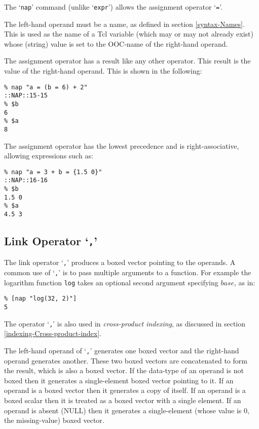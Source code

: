 The `\texttt{nap}' command (unlike `\texttt{expr}')
allows the assignment operator `\texttt{=}'.

The left-hand operand must be a name, as defined in section \ref{syntax-Names}.
This is used as the name of a Tcl variable (which may or may not already exist)
whose (string) value is set to the OOC-name of the right-hand operand.

The assignment operator has a result like any other operator.
This result is the value of the right-hand operand.
This is shown in the following:
  \begin{verbatim}
% nap "a = (b = 6) + 2"
::NAP::15-15
% $b
6
% $a
8
\end{verbatim}
  
The assignment operator has the lowest precedence and is
right-associative, allowing expressions such as:
  \begin{verbatim}
% nap "a = 3 + b = {1.5 0}"
::NAP::16-16
% $b
1.5 0
% $a
4.5 3
\end{verbatim}

\subsection{Link Operator `\texttt{,}'}
    \label{op-Link}
  
 The link operator `\texttt{,}' produces a boxed vector pointing to the
  operands. A common use of `\texttt{,}' is to pass multiple arguments to a function. For
  example the logarithm function 
  \texttt{log} takes an optional second argument specifying 
  $base$, as in:
  \begin{verbatim}
% [nap "log(32, 2)"]
5
\end{verbatim}

  
 The operator `\texttt{,}' is also used in 
  \textit{cross-product indexing}, as discussed in section 
  \ref{indexing-Cross-product-index}.
  
 The left-hand operand of `\texttt{,}' generates one boxed vector and the right-hand
  operand generates another. These two boxed vectors are concatenated
  to form the result, which is also a boxed vector. If the data-type of
  an operand is not boxed then it generates a single-element boxed
  vector pointing to it. If an operand is a boxed vector then it
  generates a copy of itself. If an operand is a boxed scalar then it
  is treated as a boxed vector with a single element. If an operand is
  absent (NULL) then it generates a single-element (whose value is 0,
  the missing-value) boxed vector.

